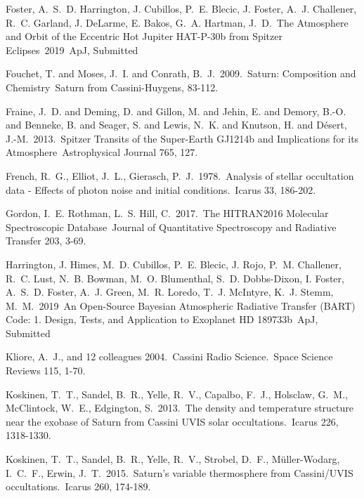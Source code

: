\documentclass[preprint]{aastex}
\begin{document}
\begin{thebibliography}{28}
 Foster, A.~S.~D. Harrington, J. Cubillos,
P.~E. Blecic, J. Foster, A.~J. Challener, R.~C. Garland, J. DeLarme, E. Bakos,
G.~A. Hartman, J.~D.\ The Atmosphere and Orbit of the Eccentric Hot Jupiter
HAT-P-30b from Spitzer Eclipses\ 2019\ ApJ, Submitted

 Fouchet, T. and Moses, J.~I. and
Conrath, B.~J.\ 2009.\ Saturn: Composition and Chemistry\ Saturn from
Cassini-Huygens, 83-112.

 {Fraine}, J.~D. and {Deming}, D. and
{Gillon}, M. and {Jehin}, E. and {Demory}, B.-O. and {Benneke}, B. and
{Seager}, S. and {Lewis}, N.~K. and {Knutson}, H. and {D{\'e}sert}, J.-M.\
2013.\ Spitzer Transits of the Super-Earth GJ1214b and Implications for its
Atmosphere\ Astrophysical Journal 765, 127.

 French, R.~G., Elliot, J.~L., 
Gierasch, P.~J.\ 1978.\ Analysis of stellar occultation data - Effects of 
photon noise and initial conditions.\ Icarus 33, 186-202. 

 {Gordon}, I.~E. {Rothman}, L.~S.
{Hill}, C.\ 2017.\ The HITRAN2016 Molecular Spectroscopic Database\ Journal of
Quantitative Spectroscopy and Radiative Transfer 203, 3-69.

 Harrington, J. Himes, M.~D. Cubillos,
P.~E. Blecic, J. Rojo, P.~M. Challener, R.~C. Lust, N.~B. Bowman, M.~O.
Blumenthal, S.~D. Dobbs-Dixon, I. Foster, A.~S.~D. Foster, A.~J. Green, M.~R.
Loredo, T.~J. McIntyre, K.~J. Stemm, M.~M.\ 2019\ An Open-Source Bayesian
Atmospheric Radiative Transfer (BART) Code: 1. Design, Tests, and Application
to Exoplanet HD 189733b\ ApJ, Submitted

 Kliore, A.~J., and 12 colleagues 2004.\ 
Cassini Radio Science.\ Space Science Reviews 115, 1-70. 

 Koskinen, T.~T., Sandel, B.~R., 
Yelle, R.~V., Capalbo, F.~J., Holsclaw, G.~M., McClintock, W.~E., Edgington, S.\ 
2013.\ The density and temperature structure near the exobase of Saturn from 
Cassini UVIS solar occultations.\ Icarus 226, 1318-1330. 

\bibitem[Koskinen et al.(2015)]{Koskinen15} Koskinen, T.~T., Sandel, B.~R., 
Yelle, R.~V., Strobel, D.~F., M{\"u}ller-Wodarg, I.~C.~F., Erwin, J.~T.\ 2015.\ 
Saturn's variable thermosphere from Cassini/UVIS occultations.\ Icarus 260, 174-189. 


\end{thebibliography}
\end{document}
